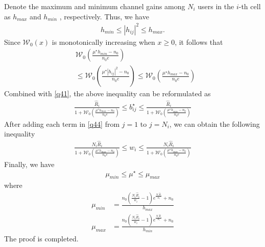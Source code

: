 \documentclass[journal]{IEEEtran}
\begin{document}
Denote the maximum and minimum channel gains among $N_i$ users in the $i$-th cell as $h_{max}$ and $h_{min}$  , respectively. Thus, we have
\begin{align}
h_{min} \leq \left|h_{ij}\right|^2 \leq h_{max}.
\end{align}
Since $\mathcal{W}_0\left(x\right)$ is monotonically increasing when $x \geq 0$, it follows that
\begin{align}
&\mathcal{W}_0\left(\frac{\mu^\star h_{min} - n_0}{n_0e}\right) \nonumber \\ & \leq  \mathcal{W}_0 \left(\frac{\mu^\star\left|h_{ij}\right|^2 - n_0}{n_0e}\right) \leq  \mathcal{W}_0\left(\frac{\mu^\star h_{max} - n_0}{n_0e}\right)
\end{align}
Combined with \eqref{q41}, the above inequality can be reformulated as
\begin{align}
\frac{\hat{R}_i}{1 + \mathcal{W}_0\left(\frac{\mu^\star h_{max} - n_0}{n_0e}\right)} \leq b_{ij}^\star \leq \frac{\hat{R}_i}{1 + \mathcal{W}_0\left(\frac{\mu^\star h_{min} - n_0}{n_0e}\right)} \label{q44}
\end{align}
After adding each term in \eqref{q44} from $j = 1$ to $j = N_i$, we can obtain the following inequality
\begin{align}
\frac{N_i\hat{R}_i}{1 + \mathcal{W}_0\left(\frac{\mu^\star h_{max} - n_0}{n_0e}\right)} \leq w_{i} \leq \frac{N_i\hat{R}_i}{1 + \mathcal{W}_0\left(\frac{\mu^\star h_{min} - n_0}{n_0e}\right)} 
\end{align}
Finally, we have
\begin{align}
\mu_{min} \leq \mu^\star \leq \mu_{max}
\end{align}
where 
\begin{align}
\mu_{min} &= \frac{n_0\left(\frac{N_i\hat{R}_i}{w_i} - 1\right)e^{\frac{N_i\hat{R}_i}{w_i}} + n_0}{h_{max}}  \\
\mu_{max} & = \frac{n_0\left(\frac{N_i\hat{R}_i}{w_i} - 1\right)e^{\frac{N_i\hat{R}_i}{w_i} } + n_0}{h_{min}}
\end{align}
The proof is completed.
 
\end{document}
